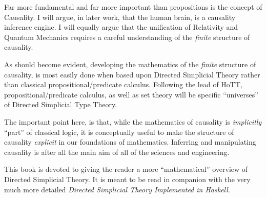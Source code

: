\documentclass[a4paper,openany]{amsbook}
\begin{document}
Far more fundamental and far more important than propositions is the concept of
Causality.  I will argue, in later work, that the human brain, is a causality
inference engine. I will equally argue that the unification of Relativity and
Quantum Mechanics requires a careful understanding of the \emph{finite}
structure of causality.

As should become evident, developing the mathematics of the \emph{finite}
structure of causality, is most easily done when based upon Directed Simplicial
Theory rather than classical propositional/predicate calculus. Following the
lead of HoTT, propositional/predicate calculus, as well as set theory will be
specific ``universes'' of Directed Simplicial Type Theory.

The important point here, is that, while the mathematics of causality is
\emph{implicitly} ``part'' of classical logic, it is conceptually useful to make
the structure of causality \emph{explicit} in our foundations of mathematics. 
Inferring and manipulating causality is after all the main aim of all of the
sciences and engineering.

This book is devoted to giving the reader a more ``mathematical'' overview of
Directed Simplicial Theory.  It is meant to be read in companion with the very
much more detailed \textit{Directed Simplicial Theory Implemented in Haskell}.



\end{document}
